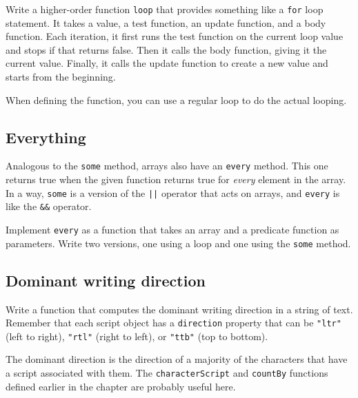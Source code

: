 Write a higher-order function \lstinline`loop` that provides something like a \lstinline`for` loop statement. It takes a value, a test function, an update function, and a body function. Each iteration, it first runs the test function on the current loop value and stops if that returns false. Then it calls the body function, giving it the current value. Finally, it calls the update function to create a new value and starts from the beginning.

When defining the function, you can use a regular loop to do the actual looping.

\subsection{Everything}

Analogous to the \lstinline`some` method, arrays also have an \lstinline`every` method. This one returns true when the given function returns true for \emph{every} element in the array. In a way, \lstinline`some` is a version of the \lstinline`||` operator that acts on arrays, and \lstinline`every` is like the \lstinline`&&` operator.

Implement \lstinline`every` as a function that takes an array and a predicate function as parameters. Write two versions, one using a loop and one using the \lstinline`some` method.

\subsection{Dominant writing direction}

Write a function that computes the dominant writing direction in a string of text. Remember that each script object has a \lstinline`direction` property that can be \lstinline`"ltr"` (left to right), \lstinline`"rtl"` (right to left), or \lstinline`"ttb"` (top to bottom).

The dominant direction is the direction of a majority of the characters that have a script associated with them. The \lstinline`characterScript` and \lstinline`countBy` functions defined earlier in the chapter are probably useful here.
